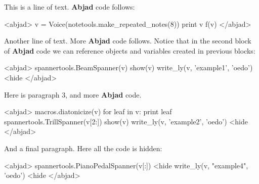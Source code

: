 \documentclass[11pt]{article}
\begin{document}
This is a line of text. \textbf{Abjad} code follows:

<abjad>
v = Voice(notetools.make_repeated_notes(8))
print v
f(v)
</abjad>

Another line of text. More \textbf{Abjad} code follows. Notice that in the second block of \textbf{Abjad} code we can reference objects and variables created in previous blocks:

<abjad>
spannertools.BeamSpanner(v)
show(v)
write_ly(v, 'example1', 'oedo') <hide
</abjad>

Here is paragraph 3, and more \textbf{Abjad} code.

<abjad>
macros.diatonicize(v)
for leaf in v: print leaf
spannertools.TrillSpanner(v[2:])
show(v)
write_ly(v, 'example2', 'oedo') <hide
</abjad>

And a final paragraph. Here all the code is hidden:

<abjad>
spannertools.PianoPedalSpanner(v[:]) <hide
write_ly(v, "example4", 'oedo') <hide
</abjad>
\end{document}
